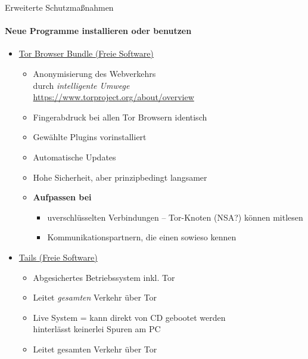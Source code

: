 \begin{frame}{Erweiterte Schutzmaßnahmen}
\framesubtitle{Neue Programme installieren oder benutzen}
  \begin{itemize}
    \item \href{https://www.torproject.org}{Tor Browser Bundle (Freie Software)}
    \begin{itemize}
      \item Anonymisierung des Webverkehrs\\durch \emph{\glqq intelligente Umwege\grqq}\\
        \scriptsize \url{https://www.torproject.org/about/overview} \normalsize
      \item Fingerabdruck bei allen Tor Browsern identisch
      \item Gewählte Plugins vorinstalliert
      \item Automatische Updates
      \item Hohe Sicherheit, aber prinzipbedingt langsamer
      \item \textbf{Aufpassen bei}
        \begin{itemize}
          \item uverschlüsselten Verbindungen -- Tor-Knoten (NSA?) können mitlesen
          \item Kommunikationspartnern, die einen sowieso kennen
        \end{itemize}
    \end{itemize}
    \pause
    \item \href{https://tails.boum.org}{Tails (Freie Software)}
    \begin{itemize}
      \item Abgesichertes Betriebssystem inkl. Tor
      \item Leitet \emph{gesamten} Verkehr über Tor
      \item Live System = kann direkt von CD gebootet werden\\ hinterlässt keinerlei Spuren am PC
      \item Leitet gesamten Verkehr über Tor
    \end{itemize}
  \end{itemize}
\end{frame}

\endinput

